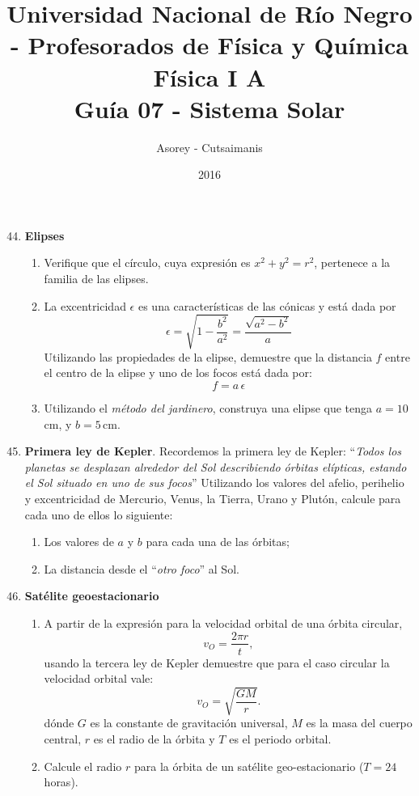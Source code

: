 \documentclass[a4paper,12pt]{article}
\begin{document}
\title{
{\normalsize{Universidad Nacional de Río Negro - Profesorados de Física y
Química}}\\ Física I A \\ Guía 07 - Sistema Solar}
\author{Asorey - Cutsaimanis}
\date{2016}
\maketitle

\begin{enumerate}
\setcounter{enumi}{43}      %

	\item {\bf{Elipses}}
		\begin{enumerate}
			\item Verifique que el círculo, cuya expresión es $x^2 + y^2 = r^2$,
				pertenece a la familia de las elipses.
			\item La excentricidad $\epsilon$ es una características de las cónicas
				y está dada por \[ \epsilon = \sqrt{1 - \frac{b^2}{a^2}} =
				\frac{\sqrt{a^2-b^2}}{a}\] Utilizando las propiedades de la elipse,
				demuestre que la distancia $f$ entre el centro de la elipse y uno
				de los focos está dada por: \[f=a \, \epsilon\]
			\item Utilizando el {\emph{método del jardinero}}, construya una elipse
				que tenga $a=10$\,cm, y $b=5$\,cm.
		\end{enumerate}
	\item{\bf{Primera ley de Kepler}}.
		Recordemos la primera ley de Kepler: ``{\emph{Todos los planetas se
		desplazan alrededor del Sol describiendo órbitas elípticas, estando el
		Sol situado en uno de sus focos}}'' Utilizando los valores del afelio,
		perihelio y excentricidad de Mercurio, Venus, la Tierra, Urano y
		Plutón, calcule para cada uno de ellos lo siguiente:
		\begin{enumerate}
			\item Los valores de $a$ y $b$ para cada una de las órbitas;
			\item La distancia desde el ``{\emph{otro foco}}'' al Sol.
		\end{enumerate}
	\item{\bf{Satélite geoestacionario}}
		\begin{enumerate}
			\item A partir de la expresión para la velocidad orbital de una
				órbita circular, \[v_O = \frac{2 \pi r}{t},\] usando la tercera
				ley de Kepler demuestre que para el caso circular la velocidad
				orbital vale: \[v_O = \sqrt{\frac{GM}{r}}. \] dónde $G$ es la
				constante de gravitación universal, $M$ es la masa del cuerpo
				central, $r$ es el radio de la órbita y $T$ es el periodo
				orbital.  
			\item Calcule el radio $r$ para la órbita de un satélite
				geo-estacionario ($T=24$\,horas).
		\end{enumerate}
	

\end{enumerate}
\end{document}
